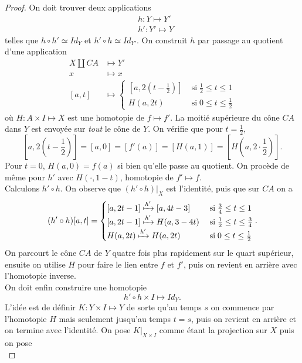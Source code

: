 \documentclass[main.tex]{subfiles}
\begin{document}
	\begin{proof}
		On doit trouver deux applications
		\begin{align*}
			&h : Y \longmapsto Y' \\
			&h' : Y' \longmapsto Y
		\end{align*}
		telles que $h\circ h' \simeq Id_Y$ et $h'\circ h \simeq Id_{Y'}$. 
		On construit $h$ par passage au quotient d'une application 
		 \begin{align*}
			 X \amalg CA &\longmapsto Y' \\
				 x&\longmapsto x \\
				 [a,t]& \longmapsto \begin{cases}
					 [a,2(t-\frac{1}{2})] \; &\text{si} \; \frac{1}{2} \le t \le 1 \\
					 H(a,2t) \; &\text{si} \; 0 \le t \le \frac{1}{2}
			 \end{cases}
		\end{align*}
		où $H : A \times I \longmapsto X$ est une homotopie de $f \longmapsto f'$.
		La moitié supérieure du cône $CA$ dans $Y$ est envoyée sur \emph{tout} le cône de $Y$. On vérifie que pour $t=\frac{1}{2}$, \[[a,2(t-\frac{1}{2})] = [a,0] = [f'(a)] = [H(a,1)] = [H(a,2\cdot \frac{1}{2})].\]
		Pour $t=0$, $H(a,0) = f(a)$ si bien qu'elle passe au quotient. On procède de même pour $h'$ avec $H(\cdot , 1-t)$, homotopie de  $f' \longmapsto f$. \\
		Calculons $h' \circ h$. On observe que $(h'\circ h)|_X$ est l'identité, puis que sur $CA$ on a \[
			(h'\circ h)[a,t] = \begin{cases}
				[a,2t-1] \xmapsto{h'} [a,4t-3] \; &\text{si} \; \frac{3}{4} \le t \le 1 \\
				[a,2t-1] \xmapsto{h'} H(a,3-4t) \; &\text{si} \; \frac{1}{2} \le t \le \frac{3}{4} \\
				H(a,2t) \xmapsto{h'} H(a,2t) \; &\text{si} \; 0 \le t \le \frac{1}{2}
			\end{cases}
		.\] 
		On parcourt le cône $CA$ de $Y$ quatre fois plus rapidement sur le quart supérieur, ensuite on utilise $H$ pour faire le lien entre $f$ et $f'$, puis on revient en arrière avec l'homotopie inverse. \\
		On doit enfin construire une homotopie \[
			h'\circ h \times I \longmapsto Id_{Y}
		.\] 
		L'idée est de définir $K : Y \times I \longmapsto Y$ de sorte qu'au temps $s$ on commence par l'homotopie $H$ mais seulement jusqu'au temps $t=s$, puis on revient en arrière et on termine avec l'identité.
		On pose $K|_{X\times I}$ comme étant la projection sur $X$ puis on pose  \[
\]
\end{proof}
\end{document}
